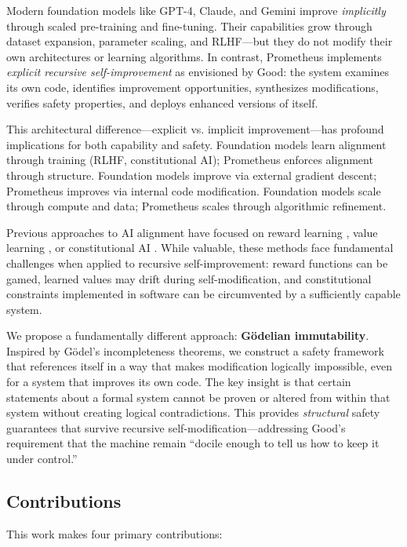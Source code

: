 \documentclass[11pt,letterpaper]{article}
\begin{document}
Modern foundation models like GPT-4, Claude, and Gemini improve \textit{implicitly} through scaled pre-training and fine-tuning. Their capabilities grow through dataset expansion, parameter scaling, and RLHF—but they do not modify their own architectures or learning algorithms. In contrast, Prometheus implements \textit{explicit recursive self-improvement} as envisioned by Good: the system examines its own code, identifies improvement opportunities, synthesizes modifications, verifies safety properties, and deploys enhanced versions of itself.

This architectural difference—explicit vs. implicit improvement—has profound implications for both capability and safety. Foundation models learn alignment through training (RLHF, constitutional AI); Prometheus enforces alignment through structure. Foundation models improve via external gradient descent; Prometheus improves via internal code modification. Foundation models scale through compute and data; Prometheus scales through algorithmic refinement.

Previous approaches to AI alignment have focused on reward learning \cite{christiano2017}, value learning \cite{russell2019}, or constitutional AI \cite{bai2022}. While valuable, these methods face fundamental challenges when applied to recursive self-improvement: reward functions can be gamed, learned values may drift during self-modification, and constitutional constraints implemented in software can be circumvented by a sufficiently capable system.

We propose a fundamentally different approach: \textbf{Gödelian immutability}. Inspired by Gödel's incompleteness theorems, we construct a safety framework that references itself in a way that makes modification logically impossible, even for a system that improves its own code. The key insight is that certain statements about a formal system cannot be proven or altered from within that system without creating logical contradictions. This provides \textit{structural} safety guarantees that survive recursive self-modification—addressing Good's requirement that the machine remain ``docile enough to tell us how to keep it under control.''

\subsection{Contributions}

This work makes four primary contributions:
\end{document}
